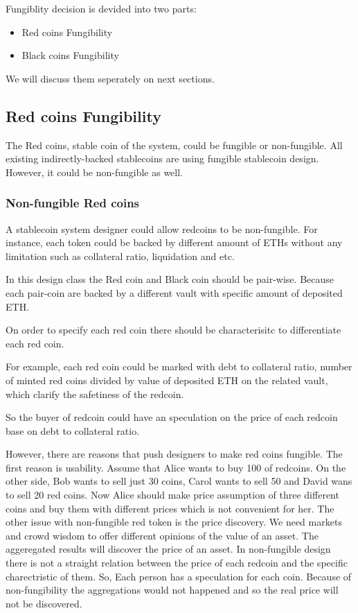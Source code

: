 Fungiblity decision is devided into two parts:
\begin{itemize}
  \item Red coins Fungibility
  \item Black coins Fungibility
\end{itemize} 
We will discuss them seperately on next sections.


\subsection{Red coins Fungibility}
The Red coins, stable coin of the system, could be fungible or non-fungible. All existing indirectly-backed stablecoins are using fungible stablecoin design. However, it could be non-fungible as well.

\subsubsection{Non-fungible Red coins}
A stablecoin system designer could allow redcoins to be non-fungible. For instance, each token could be backed by different amount of ETHs without any limitation such as collateral ratio, liquidation and etc.

In this design class the Red coin and Black coin should be pair-wise. Because each pair-coin are backed by a different vault with specific amount of deposited ETH.

On order to specify each red coin there should be characterisitc to differentiate each red coin.

For example, each red coin could be marked with debt to collateral ratio, number of minted red coins divided by value of deposited ETH on the related vault, which clarify the safetiness of the redcoin.

So the buyer of redcoin could have an speculation on the price of each redcoin base on debt to collateral ratio.

However, there are reasons that push designers to make red coins fungible. The first reason is usability. Assume that Alice wants to buy 100 of redcoins. On the other side, Bob wants to sell just 30 coins, Carol wants to sell 50 and David wans to sell 20 red coins. Now Alice should make price assumption of three different coins and buy them with different prices which is not convenient for her.
The other issue with non-fungible red token is the price discovery. We need markets and crowd wisdom to offer different opinions of the value of an asset. The aggeregated results will discover the price of an asset. In non-fungible design there is not a straight relation between the price of each redcoin and the specific charectristic of them. So, Each person has a speculation for each coin. Because of non-fungibility the aggregations would not happened and so the real price will not be discovered.

